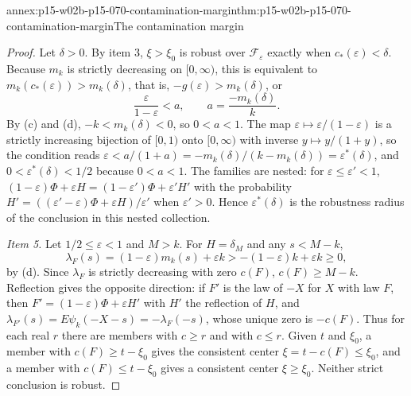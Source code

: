 \begin{annexitem}{annex:p15-w02b-p15-070-contamination-margin}{thm:p15-w02b-p15-070-contamination-margin}{The contamination margin}
\begin{proof}
Let \(\delta>0\). By item 3, \(\xi>\xi_0\) is robust over
\(\mathcal F_\varepsilon\) exactly when \(c_*(\varepsilon)<\delta\).
Because \(m_k\) is strictly decreasing on \([0,\infty)\), this is
equivalent to \(m_k(c_*(\varepsilon))>m_k(\delta)\), that is,
\(-g(\varepsilon)>m_k(\delta)\), or
\[
 \frac{\varepsilon}{1-\varepsilon}<a,\qquad a=\frac{-m_k(\delta)}{k}.
\]
By (c) and (d), \(-k<m_k(\delta)<0\), so \(0<a<1\). The map
\(\varepsilon\mapsto\varepsilon/(1-\varepsilon)\) is a strictly
increasing bijection of \([0,1)\) onto \([0,\infty)\) with inverse
\(y\mapsto y/(1+y)\), so the condition reads
\(\varepsilon<a/(1+a)=-m_k(\delta)/(k-m_k(\delta))=\varepsilon^*(\delta)\),
and \(0<\varepsilon^*(\delta)<1/2\) because \(0<a<1\).
The families are nested: for \(\varepsilon\leq\varepsilon'<1\),
\((1-\varepsilon)\Phi+\varepsilon H=(1-\varepsilon')\Phi+\varepsilon'H'\)
with the probability
\(H'=((\varepsilon'-\varepsilon)\Phi+\varepsilon H)/\varepsilon'\)
when \(\varepsilon'>0\). Hence \(\varepsilon^*(\delta)\) is the
robustness radius of the conclusion in this nested collection.

\emph{Item 5.} Let \(1/2\leq\varepsilon<1\) and \(M>k\). For
\(H=\delta_M\) and any \(s<M-k\),
\[
 \lambda_F(s)=(1-\varepsilon)m_k(s)+\varepsilon k
 >-(1-\varepsilon)k+\varepsilon k\geq0,
\]
by (d). Since \(\lambda_F\) is strictly decreasing with zero \(c(F)\),
\(c(F)\geq M-k\). Reflection gives the opposite direction: if \(F'\) is
the law of \(-X\) for \(X\) with law \(F\), then
\(F'=(1-\varepsilon)\Phi+\varepsilon H'\) with \(H'\) the reflection of
\(H\), and \(\lambda_{F'}(s)=E\psi_k(-X-s)=-\lambda_F(-s)\), whose unique
zero is \(-c(F)\). Thus for each real \(r\) there are members with
\(c\geq r\) and with \(c\leq r\). Given \(t\) and \(\xi_0\), a member
with \(c(F)\geq t-\xi_0\) gives the consistent center
\(\xi=t-c(F)\leq\xi_0\), and a member with \(c(F)\leq t-\xi_0\) gives a
consistent center \(\xi\geq\xi_0\). Neither strict conclusion is robust.
\end{proof}
\end{annexitem}

